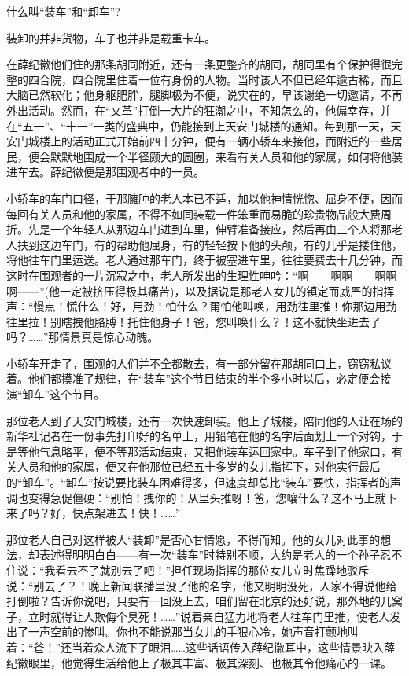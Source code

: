 \par 什么叫“装车”和“卸车”?
\par 装卸的并非货物，车子也并非是载重卡车。
\par 在薛纪徽他们住的那条胡同附近，还有一条更整齐的胡同，胡同里有个保护得很完整的四合院，四合院里住着一位有身份的人物。当时该人不但已经年逾古稀，而且大脑已然软化；他身躯肥胖，腿脚极为不便，说实在的，早该谢绝一切邀请，不再外出活动。然而，在“文革”打倒一大片的狂潮之中，不知怎么的，他偏幸存，并在“五一”、“十一”一类的盛典中，仍能接到上天安门城楼的通知。每到那一天，天安门城楼上的活动正式开始前四十分钟，便有一辆小轿车来接他，而附近的一些居民，便会默默地围成一个半径颇大的圆圈，来看有关人员和他的家属，如何将他装进车去。薛纪徽便是那围观者中的一员。
\par 小轿车的车门口径，于那臃肿的老人本已不适，加以他神情恍惚、屈身不便，因而每回有关人员和他的家属，不得不如同装载一件笨重而易脆的珍贵物品般大费周折。先是一个年轻人从那边车门进到车里，伸臂准备接应，然后再由三个人将那老人扶到这边车门，有的帮助他屈身，有的轻轻按下他的头颅，有的几乎是搂住他，将他往车门里运送。老人通过那车门，终于被塞进车里，往往要费去十几分钟，而这时在围观者的一片沉寂之中，老人所发出的生理性呻吟：“啊——啊啊——啊啊啊——”(他一定被挤压得极其痛苦)，以及据说是那老人女儿的镇定而威严的指挥声：“慢点！慌什么！好，用劲！怕什么？甭怕他叫唤，用劲往里推！你那边用劲往里拉！别瞎拽他胳膊！托住他身子！爸，您叫唤什么？！这不就快坐进去了吗？……”那情景真是惊心动魄。
\par 小轿车开走了，围观的人们并不全都散去，有一部分留在那胡同口上，窃窃私议着。他们都摸准了规律，在“装车”这个节目结束的半个多小时以后，必定便会接演“卸车”这个节目。
\par 那位老人到了天安门城楼，还有一次快速卸装。他上了城楼，陪同他的人让在场的新华社记者在一份事先打印好的名单上，用铅笔在他的名字后面划上一个对钩，于是等他气息略平，便不等那活动结束，又把他装车运回家中。车子到了他家口，有关人员和他的家属，便又在他那位已经五十多岁的女儿指挥下，对他实行最后的“卸车”。“卸车”按说要比装车困难得多，但速度却总比“装车”要快，指挥者的声调也变得急促僵硬：“别怕！拽你的！从里头推呀！爸，您嚷什么？这不马上就下来了吗？好，快点架进去！快！……”
\par 那位老人自己对这样被人“装卸”是否心甘情愿，不得而知。他的女儿对此事的想法，却表述得明明白白——有一次“装车”时特别不顺，大约是老人的一个孙子忍不住说：“我看去不了就别去了吧！”担任现场指挥的那位女儿立时焦躁地驳斥说：“别去了？！晚上新闻联播里没了他的名字，他又明明没死，人家不得说他给打倒啦？告诉你说吧，只要有一回没上去，咱们留在北京的还好说，那外地的几窝子，立时就得让人欺侮个臭死！……”说着亲自猛力地将老人往车门里推，使老人发出了一声空前的惨叫。你也不能说那当女儿的手狠心冷，她声音打颤地叫着：“爸！”还当着众人流下了眼泪……这些话语传入薛纪徽耳中，这些情景映入薛纪徽眼里，他觉得生活给他上了极其丰富、极其深刻、也极其令他痛心的一课。
